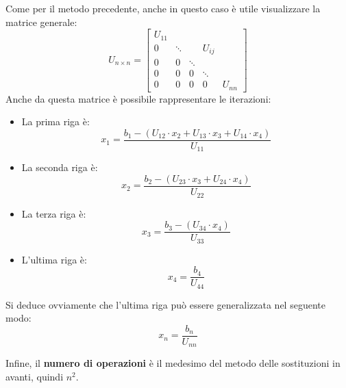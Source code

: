 \noindent
Come per il metodo precedente, anche in questo caso è utile visualizzare la matrice generale:
\begin{equation*}
    U_{n \times n} = \begin{bmatrix}
        U_{11} &   &   &   &   \\
        0 & \ddots &   & U_{ij} & \\
        0 & 0 & \ddots &   &   \\
        0 & 0 & 0 & \ddots &   \\
        0 & 0 & 0 & 0 & U_{nn}
    \end{bmatrix}
\end{equation*}
Anche da questa matrice è possibile rappresentare le iterazioni:
\begin{itemize}
    \item La prima riga è:
    \begin{equation*}
        x_{1} = \dfrac{
            b_{1} - (U_{12} \cdot x_{2} + U_{13} \cdot x_{3} + U_{14} \cdot x_{4})
        }{
            U_{11}
        }
    \end{equation*}

    \item La seconda riga è:
    \begin{equation*}
        x_{2} = \dfrac{
            b_{2} - (U_{23} \cdot x_{3} + U_{24} \cdot x_{4})
        }{
            U_{22}
        }
    \end{equation*}

    \item La terza riga è:
    \begin{equation*}
        x_{3} = \dfrac{
            b_{3} - (U_{34} \cdot x_{4})
        }{
            U_{33}
        }
    \end{equation*}

    \item L'ultima riga è:
    \begin{equation*}
        x_{4} = \dfrac{
            b_{4}
        }{
            U_{44}
        }
    \end{equation*}
\end{itemize}
Si deduce ovviamente che l'ultima riga può essere generalizzata nel seguente modo:
\begin{equation*}
    x_{n} = \dfrac{b_{n}}{U_{nn}}
\end{equation*}

\noindent
Infine, il \textbf{numero di operazioni} è il medesimo del metodo delle sostituzioni in avanti, quindi $n^{2}$.

